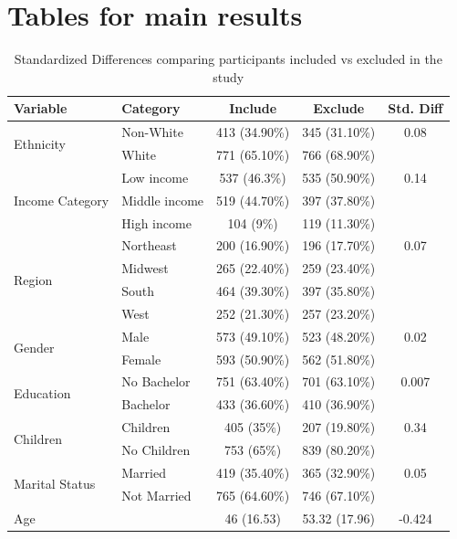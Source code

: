 \documentclass[12pt]{article}
\begin{document}
\clearpage










\section{Tables for main results}

\begin{table}[htbp]
\centering
\footnotesize
\caption{Standardized Differences comparing participants included vs excluded in the study}
\label{tab:Incomplete}
\begin{threeparttable}
\begin{tabular}{llccc}
\toprule
\textbf{Variable} & \textbf{Category} & \textbf{Include} & \textbf{Exclude} & \textbf{Std. Diff} \\
\midrule
\multirow{2}{*}{Ethnicity} & Non-White & 413 (34.90\%) & 345 (31.10\%) & 0.08 \\
                           & White     & 771 (65.10\%) & 766 (68.90\%) & \\
\midrule
\multirow{3}{*}{Income Category} & Low income    & 537 (46.3\%) & 535 (50.90\%) & 0.14 \\
                                 & Middle income & 519 (44.70\%) & 397 (37.80\%) & \\
                                 & High income   & 104 (9\%)  & 119 (11.30\%) & \\
\midrule
\multirow{4}{*}{Region} & Northeast & 200 (16.90\%) & 196 (17.70\%) & 0.07 \\
                        & Midwest   & 265 (22.40\%) & 259 (23.40\%) & \\
                        & South     & 464 (39.30\%) & 397 (35.80\%) & \\
                        & West      & 252 (21.30\%) & 257 (23.20\%) & \\
\midrule
\multirow{2}{*}{Gender} & Male   & 573 (49.10\%) & 523 (48.20\%) & 0.02 \\
                        & Female & 593 (50.90\%) & 562 (51.80\%) & \\
\midrule
\multirow{2}{*}{Education} & No Bachelor & 751 (63.40\%) & 701 (63.10\%) & 0.007 \\
                           & Bachelor    &  433   (36.60\%)        &   410 (36.90\%)          &  \\
\midrule
\multirow{2}{*}{Children} & Children     & 405 (35\%) & 207 (19.80\%) & 0.34 \\
                          & No Children  & 753 (65\%) & 839 (80.20\%) & \\
\midrule
\multirow{2}{*}{Marital Status} & Married     & 419 (35.40\%) & 365 (32.90\%) & 0.05 \\
                                & Not Married &   765 (64.60\%)          &    746 (67.10\%)         & \\
\midrule
Age  & & 46 (16.53) & 53.32 (17.96) & -0.424 \\
\bottomrule
\end{tabular}
\begin{tablenotes}


\end{tablenotes}
\end{threeparttable}
\end{table}
\end{document}
